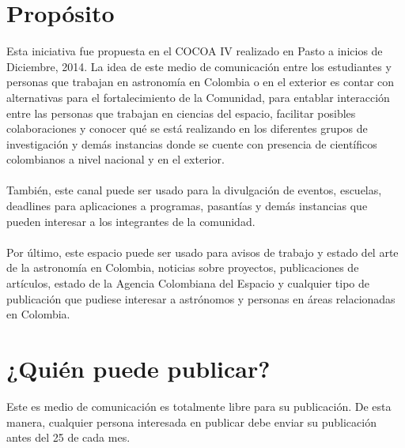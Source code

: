 \documentclass{book}
\begin{document}



\newpage


\renewcommand\thesection{\arabic{section}}
\renewcommand\thesubsection{\arabic{subsection}}

\section*{Propósito}
Esta iniciativa fue propuesta en el COCOA IV realizado en Pasto a inicios de Diciembre, 2014. La idea de este medio de comunicación entre los estudiantes y personas que trabajan en astronomía en Colombia o en el exterior es contar con alternativas para el fortalecimiento de la Comunidad, para entablar interacción entre las personas que trabajan en ciencias del  espacio, facilitar posibles colaboraciones y conocer qué se está realizando en los diferentes grupos de investigación y demás instancias donde se cuente con presencia de científicos colombianos a nivel nacional y en el exterior. \\
\\
También, este canal puede ser usado para la divulgación de eventos, escuelas, deadlines para aplicaciones a programas, pasantías y demás instancias que pueden interesar a los integrantes de la comunidad.  \\
\\
Por último, este espacio puede ser usado para avisos de trabajo y estado del arte de la astronomía en Colombia, noticias sobre proyectos, publicaciones de artículos, estado de la Agencia Colombiana del Espacio y cualquier tipo de publicación que pudiese interesar a astrónomos y personas en áreas relacionadas en Colombia.

\section*{¿Quién puede publicar?}
Este es medio de comunicación es totalmente libre para su publicación. De esta manera, cualquier persona interesada en publicar debe enviar su publicación antes del 25 de cada mes.

\end{document}
